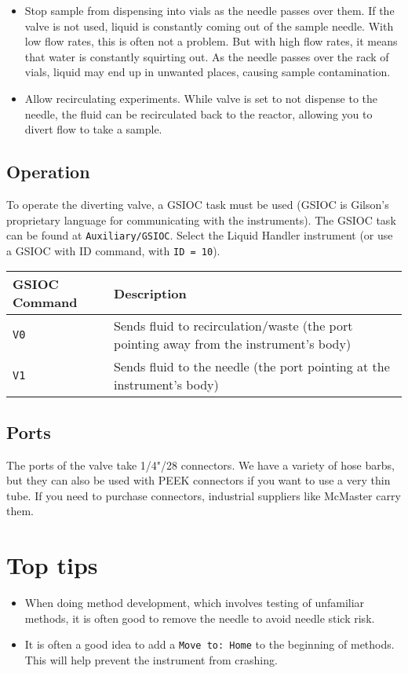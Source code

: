 \documentclass[11pt, oneside]{article}   	%
\begin{document}
\begin{enumerate}
\begin{itemize}
	\item Stop sample from dispensing into vials as the needle passes over them. If the valve is not used, liquid is constantly coming out of the sample needle. With low flow rates, this is often not a problem. But with high flow rates, it means that water is constantly squirting out. As the needle passes over the rack of vials, liquid may end up in unwanted places, causing sample contamination.
	\item Allow recirculating experiments. While valve is set to not dispense to the needle, the fluid can be recirculated back to the reactor, allowing you to divert flow to take a sample.
\end{itemize}

\subsection*{Operation}
To operate the diverting valve, a GSIOC task must be used (GSIOC is Gilson's proprietary language for communicating with the instruments). The GSIOC task can be found at \texttt{Auxiliary/GSIOC}. Select the Liquid Handler instrument (or use a GSIOC with ID command, with \texttt{ID = 10}).

\begin{center}
	\begin{tabular}{l p{10cm}}
		\hline
		GSIOC Command & Description \\
		\hline \hline
		\texttt{V0} & Sends fluid to recirculation/waste (the port pointing away from the instrument's body)\\
		\texttt{V1} & Sends fluid to the needle  (the port pointing at the instrument's body) \\
		\hline
	\end{tabular}
\end{center}

\subsection*{Ports}
The ports of the valve take 1/4"/28 connectors. We have a variety of hose barbs, but they can also be used with PEEK connectors if you want to use a very thin tube. If you need to purchase connectors, industrial suppliers like McMaster carry them.

\section*{Top tips}
\begin{itemize}
	\item When doing method development, which involves testing of unfamiliar methods, it is often good to remove the needle to avoid needle stick risk.
	\item It is often a good idea to add a \texttt{Move to: Home} to the beginning of methods. This will help prevent the instrument from crashing. 
\end{itemize}

\end{enumerate}
\end{document}
